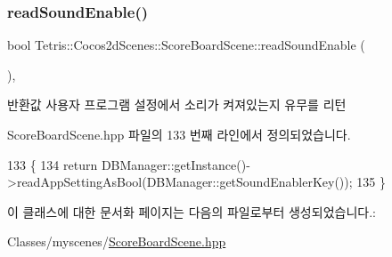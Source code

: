 \subsubsection{\texorpdfstring{read\+Sound\+Enable()}{readSoundEnable()}}
{\footnotesize\ttfamily bool Tetris\+::\+Cocos2d\+Scenes\+::\+Score\+Board\+Scene\+::read\+Sound\+Enable (\begin{DoxyParamCaption}{ }\end{DoxyParamCaption})\hspace{0.3cm}{\ttfamily [inline]}, {\ttfamily [protected]}}

\begin{DoxyReturn}{반환값}
사용자 프로그램 설정에서 소리가 켜져있는지 유무를 리턴 
\end{DoxyReturn}


Score\+Board\+Scene.\+hpp 파일의 133 번째 라인에서 정의되었습니다.


\begin{DoxyCode}
133                                   \{
134                 \textcolor{keywordflow}{return} DBManager::getInstance()->readAppSettingAsBool(DBManager::getSoundEnablerKey());
135             \}
\end{DoxyCode}


이 클래스에 대한 문서화 페이지는 다음의 파일로부터 생성되었습니다.\+:\begin{DoxyCompactItemize}
\item 
Classes/myscenes/\hyperlink{_score_board_scene_8hpp}{Score\+Board\+Scene.\+hpp}\end{DoxyCompactItemize}

